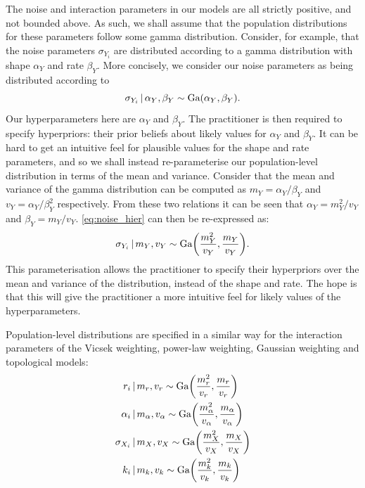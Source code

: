 The noise and interaction parameters in our models are all strictly positive, and not
bounded above. As such, we shall assume that the population distributions for these
parameters follow some gamma distribution. Consider, for example, that the noise
parameters $\sigma_{Y_i}$ are distributed according to a gamma distribution with shape
$\alpha_Y$ and rate $\beta_Y$. More concisely, we consider our noise parameters as being
distributed according to
\begin{equation}
    \label{eq:noise_hier}
    \sigma_{Y_i}\,|\,\alpha_Y,\beta_Y \sim \textrm{Ga}(\alpha_Y, \beta_Y).
\end{equation}
Our hyperparameters here are $\alpha_Y$ and $\beta_Y$. The practitioner is then
required to specify hyperpriors: their prior beliefs about likely values for $\alpha_Y$
and $\beta_Y$. It can be hard to get an intuitive feel for plausible values for the shape
and rate parameters, and so we shall instead re-parameterise our population-level
distribution in terms of the mean and variance. Consider that the mean and variance of the
gamma distribution can be computed as $m_Y = \alpha_Y / \beta_Y$ and $v_Y =
\alpha_Y/\beta_Y^2$ respectively. From these two relations it can be seen that $\alpha_Y =
m_Y^2 / v_Y$ and $\beta_Y = m_Y / v_Y$. \cref{eq:noise_hier} can then be re-expressed as:
\begin{equation}
    \sigma_{Y_i}\,|\, m_Y, v_Y \sim \textrm{Ga}\bigg(\frac{m_Y^2}{v_Y}, \frac{m_Y}{v_Y}\bigg).
\end{equation}
This parameterisation allows the practitioner to specify their hyperpriors over the mean
and variance of the distribution, instead of the shape and rate. The hope is that this
will give the practitioner a more intuitive feel for likely values of the hyperparameters.

Population-level distributions are specified in a similar way for the interaction
parameters of the Vicsek weighting, power-law weighting, Gaussian weighting and
topological models:
\begin{align}
    r_i &\,|\, m_r, v_r  \sim \textrm{Ga}\bigg(\frac{m_r^2}{v_r}, \frac{m_r}{v_r}\bigg)\\
    \alpha_i &\,|\, m_{\alpha}, v_{\alpha}  \sim
        \textrm{Ga}\bigg(\frac{m_{\alpha}^2}{v_{\alpha}}, \frac{m_{\alpha}}{v_{\alpha}}\bigg)\\
    \sigma_{X_i} &\,|\, m_X, v_X  \sim \textrm{Ga}\bigg(\frac{m_X^2}{v_X}, \frac{m_X}{v_X}\bigg)\\
    k_i &\,|\, m_k, v_k  \sim \textrm{Ga}\bigg(\frac{m_k^2}{v_k}, \frac{m_k}{v_k}\bigg)
\end{align}
